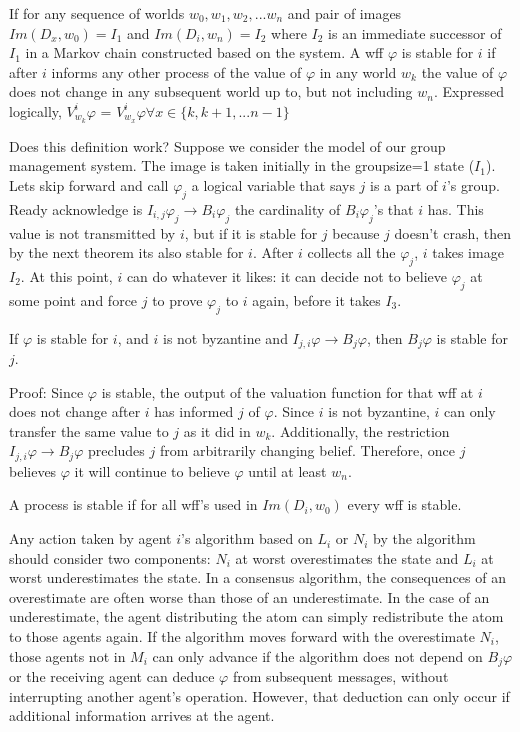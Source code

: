 \begin{pdef}
If for any sequence of worlds $w_0, w_1, w_2, ... w_n$ and pair of images $Im(D_x, w_0)=I_1$ and $Im(D_i, w_n)=I_2$ where $I_2$ is an immediate successor of $I_1$ in a Markov chain constructed based on the system. A wff $\varphi$ is stable for $i$ if after $i$ informs any other process of the value of $\varphi$ in any world $w_k$ the value of $\varphi$ does not change in any subsequent world up to, but not including $w_n$. Expressed logically, $V^i_{w_k} \varphi$ = $V^i_{w_x} \varphi \forall x \in \{k, k+1, ... n-1\}$
\end{pdef}

Does this definition work? Suppose we consider the model of our group management system. The image is taken initially in the groupsize=1 state ($I_1$). Lets skip forward and call $\varphi_j$ a logical variable that says $j$ is a part of $i$'s group. Ready acknowledge is $I_{i,j} \varphi_j \rightarrow B_i \varphi_j$ the cardinality of $B_i \varphi_j$'s that $i$ has. This value is not transmitted by $i$, but if it is stable for $j$ because $j$ doesn't crash, then by the next theorem its also stable for $i$. After $i$ collects all the $\varphi_j$, $i$ takes image $I_2$. At this point, $i$ can do whatever it likes: it can decide not to believe $\varphi_j$ at some point and force $j$ to prove $\varphi_j$ to $i$ again, before it takes $I_3$.

\begin{thm}
If $\varphi$ is stable for $i$, and $i$ is not byzantine and $I_{j,i} \varphi \rightarrow B_j \varphi$, then $B_j \varphi$ is stable for $j$.
\end{thm}

Proof: Since $\varphi$ is stable, the output of the valuation function for that wff at $i$ does not change after $i$ has informed $j$ of $\varphi$. Since $i$ is not byzantine, $i$ can only transfer the same value to $j$ as it did in $w_k$. Additionally, the restriction $I_{j,i} \varphi \rightarrow B_j \varphi$ precludes $j$ from arbitrarily changing belief. Therefore, once $j$ believes $\varphi$ it will continue to believe $\varphi$ until at least $w_n$.

\begin{pdef}
A process is stable if for all wff's used in $Im(D_i, w_0)$ every wff is stable.
\end{pdef}

Any action taken by agent $i$'s algorithm based on $L_i$ or $N_i$ by the algorithm should consider two components: $N_i$ at worst overestimates the state and $L_i$ at worst underestimates the state. In a consensus algorithm, the consequences of an overestimate are often worse than those of an underestimate. In the case of an underestimate, the agent distributing the atom can simply redistribute the atom to those agents again. If the algorithm moves forward with the overestimate $N_i$, those agents not in $M_i$ can only advance if the algorithm does not depend on $B_j \varphi$ or the receiving agent can deduce $\varphi$ from subsequent messages, without interrupting another agent's operation. However, that deduction can only occur if additional information arrives at the agent.

